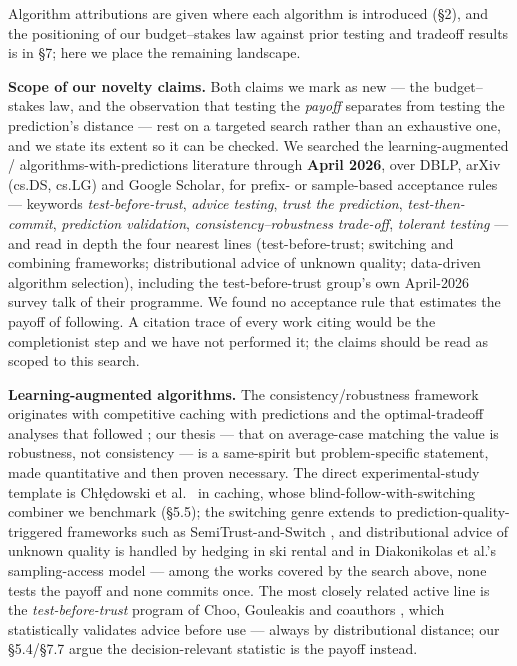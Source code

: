 Algorithm attributions are given where each algorithm is introduced
(§2), and the positioning of our budget--stakes law against prior
testing and tradeoff results is in §7; here we place the remaining
landscape.

\textbf{Scope of our novelty claims.} Both claims we mark as new --- the
budget--stakes law, and the observation that testing the \emph{payoff}
separates from testing the prediction's distance --- rest on a targeted
search rather than an exhaustive one, and we state its extent so it can
be checked. We searched the learning-augmented /
algorithms-with-predictions literature through \textbf{April 2026}, over
DBLP, arXiv (cs.DS, cs.LG) and Google Scholar, for prefix- or
sample-based acceptance rules --- keywords \emph{test-before-trust},
\emph{advice testing}, \emph{trust the prediction},
\emph{test-then-commit}, \emph{prediction validation},
\emph{consistency--robustness trade-off}, \emph{tolerant testing} ---
and read in depth the four nearest lines (test-before-trust; switching
and combining frameworks; distributional advice of unknown quality;
data-driven algorithm selection), including the test-before-trust
group's own April-2026 survey talk of their programme. We found no
acceptance rule that estimates the payoff of following. A citation trace
of every work citing \cite{choo2024imperfect} would be the completionist
step and we have not performed it; the claims should be read as scoped
to this search.

\textbf{Learning-augmented algorithms.} The consistency/robustness
framework originates with competitive caching with predictions
\cite{lykouris2018caching} and the optimal-tradeoff analyses that
followed \cite{weizhang2020tradeoffs}; our thesis --- that on
average-case matching the value is robustness, not consistency --- is a
same-spirit but problem-specific statement, made quantitative and then
proven necessary. The direct experimental-study template is Chłędowski
et al.~\cite{chledowski2021caching} in caching, whose
blind-follow-with-switching combiner we benchmark (§5.5); the switching
genre extends to prediction-quality-triggered frameworks such as
SemiTrust-and-Switch \cite{antoniadis2025switching}, and distributional
advice of unknown quality is handled by hedging in ski rental
\cite{cui2026skirental} and in Diakonikolas et al.'s sampling-access
model --- among the works covered by the search above, none tests the
payoff and none commits once. The most closely related active line is
the \emph{test-before-trust} program of Choo, Gouleakis and coauthors
\cite{choo2024imperfect,bhattacharyya2025product}, which statistically
validates advice before use --- always by distributional distance; our
§5.4/§7.7 argue the decision-relevant statistic is the payoff instead.

